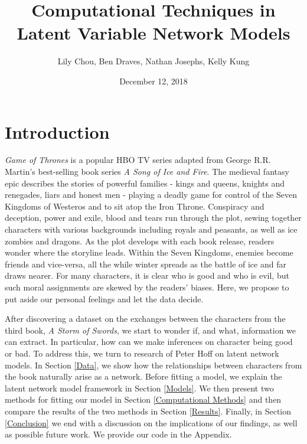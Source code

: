 \documentclass{article}
\title{Computational Techniques in Latent Variable Network Models}
\author{Lily Chou, Ben Draves, Nathan Josephs, Kelly Kung}
\date{December 12, 2018}
\begin{document}
\maketitle

\section{Introduction}

\textit{Game of Thrones} is a popular HBO TV series adapted from George R.R. Martin's best-selling book series \textit{A Song of Ice and Fire}. The medieval fantasy epic describes the stories of powerful families - kings and queens, knights and renegades, liars and honest men - playing a deadly game for control of the Seven Kingdoms of Westeros and to sit atop the Iron Throne. Conspiracy and deception, power and exile, blood and tears run through the plot, sewing together characters with various backgrounds including royals and peasants, as well as ice zombies and dragons. As the plot develops with each book release, readers wonder where the storyline leads. Within the Seven Kingdoms, enemies become friends and vice-versa, all the while winter spreads as the battle of ice and far draws nearer. For many characters, it is clear who is good and who is evil, but such moral assignments are skewed by the readers' biases. Here, we propose to put aside our personal feelings and let the data decide.

After discovering a dataset on the exchanges between the characters from the third book, \textit{A Storm of Swords}, we start to wonder if, and what, information we can extract. In particular, how can we make inferences on character being good or bad. To address this, we turn to research of Peter Hoff on latent network models. In Section \ref{Data}, we show how the relationships between characters from the book naturally arise as a network. Before fitting a model, we explain the latent network model framework in Section \ref{Models}. We then present two methods for fitting our model in Section \ref{Computational Methods} and then compare the results of the two methods in Section \ref{Results}. Finally, in Section \ref{Conclusion} we end with a discussion on the implications of our findings, as well as possible future work. We provide our code in the Appendix.
\end{document}
